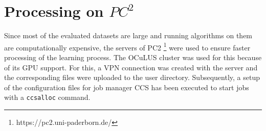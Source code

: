 \section{Processing on $PC^2$}
\label{sec:processing_on_pc2}
%
Since most of the evaluated datasets are large and running algorithms on them are computationally expensive, the servers of \ac{PC2} \footnote{https://pc2.uni-paderborn.de/} were used to ensure faster processing of the learning process.
The \ac{OCuLUS} cluster was used for this because of its GPU support.
For this, a \ac{VPN} connection was created with the server and the corresponding files were uploaded to the user directory.
Subsequently, a setup of the configuration files for job manager CCS has been executed to start jobs with a \texttt{ccsalloc} command.
